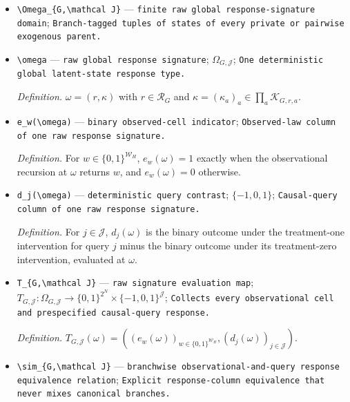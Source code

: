 \documentclass{article}
\begin{document}
\begin{itemize}
  \item \texttt{\textbackslash{}\allowbreak{}Omega\_\allowbreak{}\{G,\allowbreak{}\textbackslash{}\allowbreak{}mathcal J\}\allowbreak{}} --- \texttt{finite raw global response-\allowbreak{}signature domain}; \texttt{Branch-\allowbreak{}tagged tuples of states of every private or pairwise exogenous parent.}
  \item \texttt{\textbackslash{}\allowbreak{}omega} --- \texttt{raw global response signature}; \(\Omega_{G,\mathcal J}\); \texttt{One deterministic global latent-\allowbreak{}state response type.}
  \par\smallskip\noindent\emph{Definition.} \(\omega=(r,\kappa)\) with \(r\in\mathcal R_G\) and \(\kappa=(\kappa_a)_a\in\prod_a\mathcal K_{G,r,a}\).
  \item \texttt{e\_\allowbreak{}w(\textbackslash{}\allowbreak{}omega)} --- \texttt{binary observed-\allowbreak{}cell indicator}; \texttt{Observed-\allowbreak{}law column of one raw response signature.}
  \par\smallskip\noindent\emph{Definition.} For \(w\in\{0,1\}^{\mathcal W_H}\), \(e_w(\omega)=1\) exactly when the observational recursion at \(\omega\) returns \(w\), and \(e_w(\omega)=0\) otherwise.
  \item \texttt{d\_\allowbreak{}j(\textbackslash{}\allowbreak{}omega)} --- \texttt{deterministic query contrast}; \(\{-1,0,1\}\); \texttt{Causal-\allowbreak{}query column of one raw response signature.}
  \par\smallskip\noindent\emph{Definition.} For \(j\in\mathcal J\), \(d_j(\omega)\) is the binary outcome under the treatment-one intervention for query \(j\) minus the binary outcome under its treatment-zero intervention, evaluated at \(\omega\).
  \item \texttt{T\_\allowbreak{}\{G,\allowbreak{}\textbackslash{}\allowbreak{}mathcal J\}\allowbreak{}} --- \texttt{raw signature evaluation map}; \(T_{G,\mathcal J}:\Omega_{G,\mathcal J}\to\{0,1\}^{2^N}\times\{-1,0,1\}^{\mathcal J}\); \texttt{Collects every observational cell and prespecified causal-\allowbreak{}query response.}
  \par\smallskip\noindent\emph{Definition.} \(T_{G,\mathcal J}(\omega)=((e_w(\omega))_{w\in\{0,1\}^{\mathcal W_H}},(d_j(\omega))_{j\in\mathcal J})\).
  \item \texttt{\textbackslash{}\allowbreak{}sim\_\allowbreak{}\{G,\allowbreak{}\textbackslash{}\allowbreak{}mathcal J\}\allowbreak{}} --- \texttt{branchwise observational-\allowbreak{}and-\allowbreak{}query response equivalence relation}; \texttt{Explicit response-\allowbreak{}column equivalence that never mixes canonical branches.}

\end{itemize}
\end{document}
